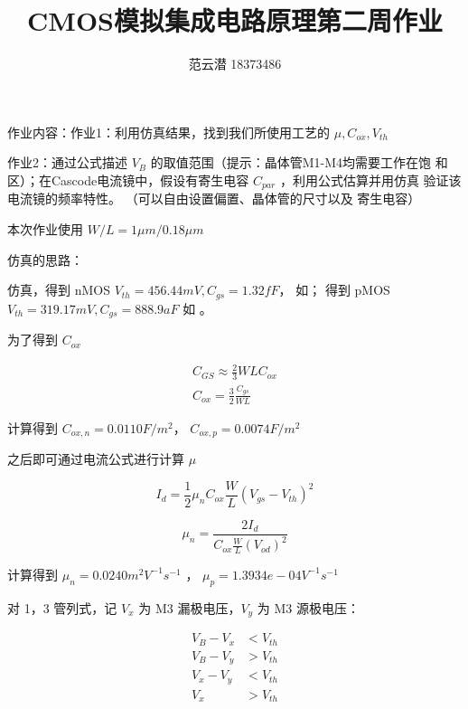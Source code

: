\documentclass[lang=cn,11pt,a4paper,cite=authoryear]{elegantpaper}
\title{CMOS模拟集成电路原理\quad 第二周作业}
\author{范云潜 18373486}
\institute{微电子学院 184111 班}
\date{\zhtoday}
\begin{document}
\maketitle

作业内容：作业1：利用仿真结果，找到我们所使用工艺的 \(\mu, C_{ox}, V_{th}\)

作业2：通过公式描述 \(V_B\) 的取值范围（提示：晶体管M1-M4均需要工作在饱
和区）；在Cascode电流镜中，假设有寄生电容 \(C_{par}\) ，利用公式估算并用仿真
验证该电流镜的频率特性。 （可以自由设置偏置、晶体管的尺寸以及
寄生电容）



本次作业使用 \(W/L = 1\mu m / 0.18 \mu m\)


仿真的思路：

仿真，得到 nMOS \(V_{th} = 456.44 mV, C_{gs} = 1.32 fF \)， 如； 得到 pMOS \(V_{th} = 319.17 mV, C_{gs} = 888.9 aF\) 如 。




为了得到 \(C_{ox}\) 

\[\begin{aligned}
    C_{GS} \approx \frac{2}{3} WL C_{ox} \\ 
    C_{ox} = \frac{3}{2} \frac{C_{gs}}{WL} 
\end{aligned}\]

计算得到 \(C_{ox,n} = 0.0110 F/m^2\)， \(C_{ox,p} = 0.0074 F/m^2\)

之后即可通过电流公式进行计算 \(\mu\)

\[I_d = \frac{1}{2} \mu_n C_{ox} \frac{W}{L} (V_{gs} - V_{th})^2\]

\[\mu_n = \frac{2 I_d}{C_{ox} \frac{W}{L}(V_{od})^2}\]

计算得到 \(\mu_n = 0.0240 m^2 V^{-1}s^{-1}\) ， \(\mu_p = 1.3934e-04V^{-1}s^{-1} \)





对 1，3 管列式，记 \(V_x\) 为 M3 漏极电压，\(V_y\) 为 M3 源极电压：

\[\begin{aligned}
    V_B - V_x &< V_{th} \\
    V_B - V_y &> V_{th} \\ 
    V_x - V_y &< V_{th} \\ 
    V_x &> V_{th}
\end{aligned}\]
\end{document}
